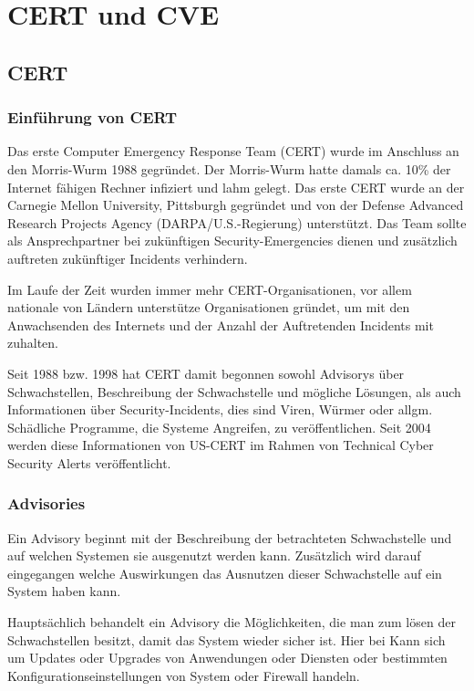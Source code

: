 \section{CERT und CVE}
  \label{compositions:cert-cve}
  \authors{\LM}{}
\subsection{CERT}
\subsubsection{Einführung von CERT} Das erste Computer Emergency
Response Team (CERT) wurde im Anschluss an den Morris-Wurm 1988
gegründet. Der Morris-Wurm hatte damals ca. 10\% der Internet fähigen
Rechner infiziert und lahm gelegt. Das erste CERT wurde an der
Carnegie Mellon University, Pittsburgh gegründet und von der Defense
Advanced Research Projects Agency (DARPA/U.S.-Regierung)
unterstützt. Das Team sollte als Ansprechpartner bei zukünftigen
Security-Emergencies dienen und zusätzlich auftreten zukünftiger
Incidents verhindern.

Im Laufe der Zeit wurden immer mehr CERT-Organisationen, vor allem
nationale von Ländern unterstütze Organisationen gründet, um mit den
Anwachsenden des Internets und der Anzahl der Auftretenden Incidents
mit zuhalten.

Seit 1988 bzw. 1998 hat CERT damit begonnen sowohl Advisorys über
Schwachstellen, Beschreibung der Schwachstelle und mögliche Lösungen,
als auch Informationen über Security-Incidents, dies sind Viren,
Würmer oder allgm. Schädliche Programme, die Systeme Angreifen, zu
veröffentlichen. Seit 2004 werden diese Informationen von US-CERT im
Rahmen von Technical Cyber Security Alerts veröffentlicht.

\subsubsection{Advisories}

Ein Advisory beginnt mit der Beschreibung der betrachteten
Schwachstelle und auf welchen Systemen sie ausgenutzt werden
kann. Zusätzlich wird darauf eingegangen welche Auswirkungen das
Ausnutzen dieser Schwachstelle auf ein System haben kann.

Hauptsächlich behandelt ein Advisory die Möglichkeiten, die man zum
lösen der Schwachstellen besitzt, damit das System wieder sicher
ist. Hier bei Kann sich um Updates oder Upgrades von Anwendungen oder
Diensten oder bestimmten Konfigurationseinstellungen von System oder
Firewall handeln.

